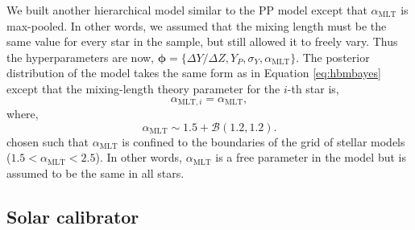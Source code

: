 \documentclass[a4paper,fleqn,usenatbib]{mnras}
\newcommand{\mlt}{\ensuremath{{\alpha_\mathrm{MLT}}}}
\begin{document}
We built another hierarchical model similar to the PP model except that $\mlt$ is max-pooled. In other words, we assumed that the mixing length must be the same value for every star in the sample, but still allowed it to freely vary. Thus the hyperparameters are now, $\boldsymbol{\phi} = \{\Delta Y/\Delta Z, Y_P, \sigma_Y, \mlt\}$. The posterior distribution of the model takes the same form as in Equation \ref{eq:hbmbayes} except that the mixing-length theory parameter for the $i$-th star is,
%
\begin{equation}
    \alpha_{\mathrm{MLT}, i} = \mlt,
\end{equation}
%
where,
\begin{equation}
    \mlt \sim 1.5 + \mathcal{B}(1.2, 1.2).
\end{equation}
chosen such that $\mlt$ is confined to the boundaries of the grid of stellar models ($1.5 < \mlt < 2.5$). In other words, $\mlt$ is a free parameter in the model but is assumed to be the same in all stars.

\subsection{Solar calibrator}\label{sec:sun}

\end{document}
